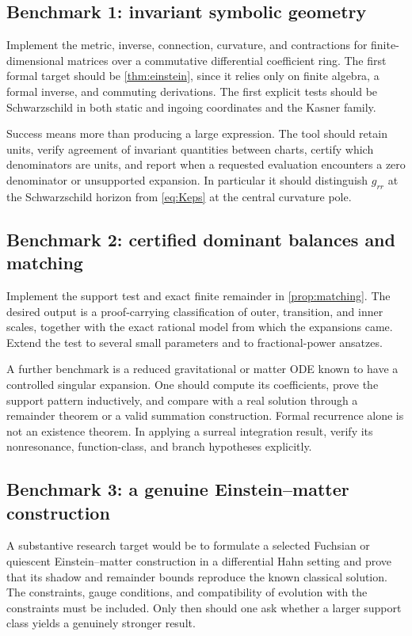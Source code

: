 \documentclass[11pt,a4paper]{article}
\numberwithin{equation}{section}
\theoremstyle{definition}
\theoremstyle{remark}
\begin{document}
\subsection{Benchmark 1: invariant symbolic geometry}
Implement the metric, inverse, connection, curvature, and contractions for
finite-dimensional matrices over a commutative differential coefficient ring.
The first formal target should be \cref{thm:einstein}, since it relies only on
finite algebra, a formal inverse, and commuting derivations. The first explicit
tests should be Schwarzschild in both static and ingoing coordinates and the
Kasner family.

Success means more than producing a large expression. The tool should retain
units, verify agreement of invariant quantities between charts, certify which
denominators are units, and report when a requested evaluation encounters a
zero denominator or unsupported expansion. In particular it should distinguish
$g_{rr}$ at the Schwarzschild horizon from \eqref{eq:Keps} at the central
curvature pole.

\subsection{Benchmark 2: certified dominant balances and matching}
Implement the support test and exact finite remainder in
\cref{prop:matching}. The desired output is a proof-carrying classification of
outer, transition, and inner scales, together with the exact rational model
from which the expansions came. Extend the test to several small parameters
and to fractional-power ansatzes.

A further benchmark is a reduced gravitational or matter ODE known to have a
controlled singular expansion. One should compute its coefficients, prove the
support pattern inductively, and compare with a real solution through a
remainder theorem or a valid summation construction. Formal recurrence alone
is not an existence theorem. In applying a surreal integration result, verify
its nonresonance, function-class, and branch hypotheses explicitly.

\subsection{Benchmark 3: a genuine Einstein--matter construction}
A substantive research target would be to formulate a selected Fuchsian or
quiescent Einstein--matter construction in a differential Hahn setting and
prove that its shadow and remainder bounds reproduce the known classical
solution. The constraints, gauge conditions, and compatibility of evolution
with the constraints must be included. Only then should one ask whether a
larger support class yields a genuinely stronger result.
\end{document}
